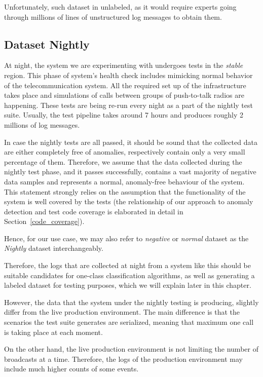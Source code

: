 Unfortunately, such dataset in unlabeled, as it would require experts going through millions of lines of unstructured log messages to obtain them.

\subsection{Dataset Nightly}
At night, the system we are experimenting with undergoes tests in the \textit{stable} region. This phase of system's health check includes mimicking normal behavior of the telecommunication system. All the required set up of the infrastructure takes place and simulations of calls between groups of push-to-talk radios are happening. 
These tests are being re-run every night as a part of the nightly test suite. 
Usually, the test pipeline takes around 7 hours and produces roughly 2 millions of log messages.

In case the nightly tests are all passed, it should be sound that the collected data are either completely free of anomalies, respectively contain only a very small percentage of them. 
Therefore, we assume that the data collected during the nightly test phase, and it passes successfully, contains a vast majority of negative data samples and represents a normal, anomaly-free behaviour of the system. This statement strongly relies on the assumption that the functionality of the system is well covered by the tests (the relationship of our approach to anomaly detection and test code coverage is elaborated in detail in Section~\ref{code_coverage}). 

Hence, for our use case, we may also refer to \textit{negative} or \textit{normal} dataset as the \textit{Nightly} dataset interchangeably.

Therefore, the logs that are collected at night from a system like this should be suitable candidates for one-class classification algorithms, as well as generating a labeled dataset for testing purposes, which we will explain later in this chapter.

However, the data that the system under the nightly testing is producing, slightly differ from the live production environment. The main difference is that the scenarios the test suite generates are serialized, meaning that maximum one call is taking place at each moment. 

On the other hand, the live production environment is not limiting the number of broadcasts at a time. Therefore, the logs of the production environment may include much higher counts of some events.

